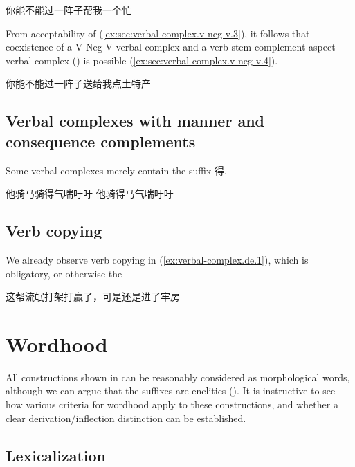 \documentclass[UTF8, a4paper, oneside, scheme=plain, 12pt]{ctexrep}
\begin{document}
\begin{exe}
    \ex\label{ex:sec:verbal-complex.v-neg-v.3} 你能不能过一阵子帮我一个忙
\end{exe}

From acceptability of (\ref{ex:sec:verbal-complex.v-neg-v.3}),
it follows that coexistence of a V-Neg-V verbal complex
and a verb stem-complement-aspect verbal complex ()
is possible (\ref{ex:sec:verbal-complex.v-neg-v.4}).

\begin{exe}
    \ex\label{ex:sec:verbal-complex.v-neg-v.4} 你能不能过一阵子送给我点土特产
\end{exe}

\subsection{Verbal complexes with manner and consequence complements}
\label{sec:verbal-complex.de}

Some verbal complexes merely contain the suffix 得.


\begin{exe}
    \ex\label{ex:verbal-complex.de.1} 他骑马骑得气喘吁吁
    \ex 他骑得马气喘吁吁
\end{exe}

\subsection{Verb copying}

We already observe verb copying in (\ref{ex:verbal-complex.de.1}),
which is obligatory, or otherwise the 

\begin{exe}
    \ex 这帮流氓打架打赢了，可是还是进了牢房
\end{exe}

\section{Wordhood}\label{sec:verbal-complex.wordhood}

All constructions shown in 
can be reasonably considered as morphological words,
although we can argue that the suffixes are enclitics
().
It is instructive to see how various criteria for wordhood apply to these constructions,
and whether a clear derivation/inflection distinction can be established.

\subsection{Lexicalization}\label{sec:verbal-complex.lexicalization}
\end{document}
